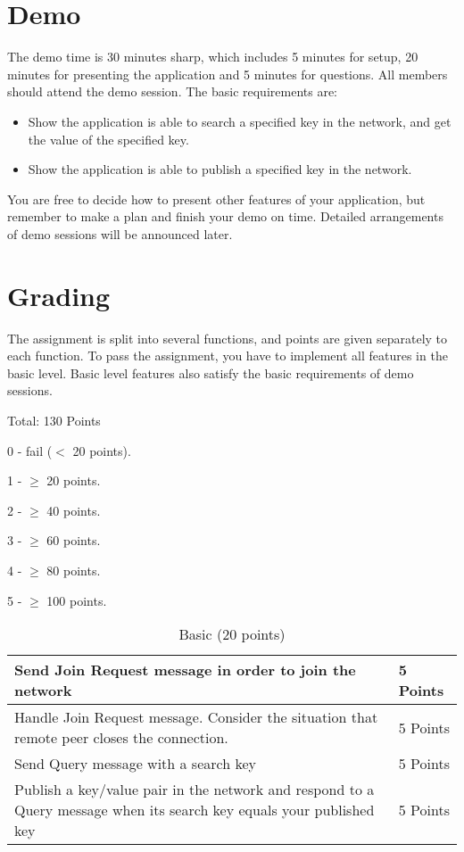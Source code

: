 \documentclass[12pt, a4paper]{article}
\begin{document}
\section{Demo}
The demo time is 30 minutes sharp, which includes 5 minutes for setup, 20 minutes for presenting the application and 5 minutes for questions.
All members should attend the demo session.
The basic requirements are:
\begin{itemize}
\item Show the application is able to search a specified key in the network, and get the value of the specified key.
\item Show the application is able to publish a specified key in the network.
\end{itemize}
You are free to decide how to present other features of your application, but remember to make a plan and finish your demo on time.
Detailed arrangements of demo sessions will be announced later.

\section{Grading}
The assignment is split into several functions, and points are given separately to each function.
To pass the assignment, you have to implement all features in the basic level.
Basic level features also satisfy the basic requirements of demo sessions.

Total: 130 Points

0 - fail ($<$ 20 points).

1 - $\ge$ 20 points.

2 - $\ge$  40 points.

3 - $\ge$ 60 points.

4 - $\ge$ 80 points.

5 - $\ge$  100 points.

\begin{table}[htdp]
\caption{Basic (20 points)}
\begin{center}
\begin{tabular}{|p{11cm}|p{2cm}|}
\hline
Send Join Request message in order to join the network & 5 Points \\
\hline
Handle Join Request message. Consider the situation that remote peer closes the connection. & 5 Points\\
\hline
Send Query message with a search key & 5 Points  \\
\hline
Publish a key/value pair in the network and respond to a Query message when its search key equals your published key & 5 Points \\
\hline
\end{tabular}
\end{center}
\end{table}
\end{document}
